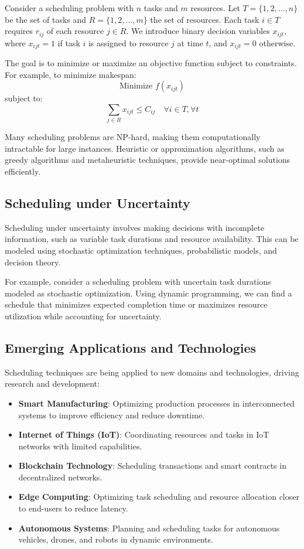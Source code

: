 \documentclass[12pt]{book} %
\begin{document}
Consider a scheduling problem with \(n\) tasks and \(m\) resources. Let \(T = \{1, 2, ..., n\}\) be the set of tasks and \(R = \{1, 2, ..., m\}\) the set of resources. Each task \(i \in T\) requires \(r_{ij}\) of each resource \(j \in R\). We introduce binary decision variables \(x_{ijt}\), where \(x_{ijt} = 1\) if task \(i\) is assigned to resource \(j\) at time \(t\), and \(x_{ijt} = 0\) otherwise. 

The goal is to minimize or maximize an objective function subject to constraints. For example, to minimize makespan:
\[
\text{Minimize } f(x_{ijt})
\]
subject to:
\[
\sum_{j \in R} x_{ijt} \leq C_{ij} \quad \forall i \in T, \forall t
\]

Many scheduling problems are NP-hard, making them computationally intractable for large instances. Heuristic or approximation algorithms, such as greedy algorithms and metaheuristic techniques, provide near-optimal solutions efficiently.

\subsection{Scheduling under Uncertainty}

Scheduling under uncertainty involves making decisions with incomplete information, such as variable task durations and resource availability. This can be modeled using stochastic optimization techniques, probabilistic models, and decision theory.

For example, consider a scheduling problem with uncertain task durations modeled as stochastic optimization. Using dynamic programming, we can find a schedule that minimizes expected completion time or maximizes resource utilization while accounting for uncertainty.

\subsection{Emerging Applications and Technologies}

Scheduling techniques are being applied to new domains and technologies, driving research and development:

\begin{itemize}
    \item \textbf{Smart Manufacturing}: Optimizing production processes in interconnected systems to improve efficiency and reduce downtime.
    \item \textbf{Internet of Things (IoT)}: Coordinating resources and tasks in IoT networks with limited capabilities.
    \item \textbf{Blockchain Technology}: Scheduling transactions and smart contracts in decentralized networks.
    \item \textbf{Edge Computing}: Optimizing task scheduling and resource allocation closer to end-users to reduce latency.
    \item \textbf{Autonomous Systems}: Planning and scheduling tasks for autonomous vehicles, drones, and robots in dynamic environments.
\end{itemize}
\end{document}
